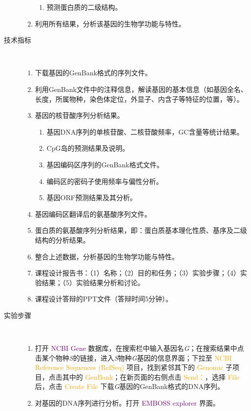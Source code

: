 \begin{description}
\begin{enumerate}
\begin{enumerate}
					\item 预测蛋白质的二级结构。
				\end{enumerate}
			\item 利用所有结果，分析该基因的生物学功能与特性。
		\end{enumerate}
	\item[技术指标] \
		\begin{enumerate}
			\item 下载基因的GenBank格式的序列文件。
			\item 利用GenBank文件中的注释信息，解读基因的基本信息（如基因全名、长度，所属物种，染色体定位，外显子、内含子等特征的位置，等）。
			\item 基因的核苷酸序列分析结果。
				\begin{enumerate}
					\item 基因DNA序列的单核苷酸、二核苷酸频率，GC含量等统计结果。
					\item CpG岛的预测结果及说明。
					\item 基因编码区序列的GenBank格式文件。
					\item 编码区的密码子使用频率与偏性分析。
					\item 基因ORF预测结果及其分析。
				\end{enumerate}
			\item 基因编码区翻译后的氨基酸序列文件。
			\item 蛋白质的氨基酸序列分析结果，即：蛋白质基本理化性质、基序及二级结构的分析结果。
			\item 整合上述数据，分析基因的生物学功能与特性。
			\item 课程设计报告书：（1）名称；（2）目的和任务；（3）实验步骤；（4）实验结果；（5）实验结果分析和讨论。
			\item 课程设计答辩的PPT文件（答辩时间5分钟）。
		\end{enumerate}
	\item[实验步骤] \ 
		\begin{enumerate}
			\item 打开 \textcolor{purple}{NCBI Gene} 数据库，在搜索栏中输入基因名\textit{G}；在搜索结果中点击某个物种\textit{S}的链接，进入\textit{S}物种\textit{G}基因的信息界面；下拉至 \textcolor{orange}{NCBI Reference Sequences (RefSeq)} 项目，找到紧邻其下的 \textcolor{orange}{Genomic} 子项目，点击其中的 \textcolor{orange}{GenBank}；在新页面的右侧点击 \textcolor{orange}{Send：}，选择 \textcolor{orange}{File} 后，点击 \textcolor{orange}{Create File} 下载\textit{G}基因的GenBank格式的DNA序列。
			\item 对基因的DNA序列进行分析。打开 \textcolor{purple}{EMBOSS explorer} 界面。 

\end{enumerate}
\end{description}
